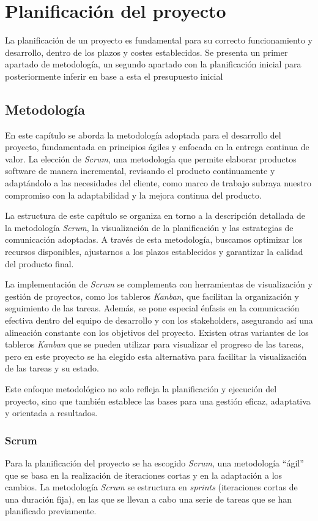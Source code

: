 \chapter{Planificación del proyecto}\label{chap:planif}
La planificación de un proyecto es fundamental para su correcto funcionamiento y desarrollo,
dentro de los plazos y costes establecidos. Se presenta un primer apartado de metodología, un
segundo apartado con la planificación inicial para posteriormente inferir en base a esta el
presupuesto inicial


\section{Metodología}\label{sec:metodología}
En este capítulo se aborda la metodología adoptada para el desarrollo del proyecto, fundamentada
en principios ágiles y enfocada en la entrega continua de valor. La elección de \textit{Scrum},
una metodología que permite elaborar productos software de manera incremental, revisando el
producto continuamente y adaptándolo a las necesidades del cliente, como marco de trabajo subraya
nuestro compromiso con la adaptabilidad y la mejora continua del producto.

La estructura de este capítulo se organiza en torno a la descripción detallada de la metodología
\textit{Scrum}, la visualización de la planificación y las estrategias de comunicación adoptadas.
A través de esta metodología, buscamos optimizar los recursos disponibles, ajustarnos a los plazos
establecidos y garantizar la calidad del producto final.

La implementación de \textit{Scrum} se complementa con herramientas de visualización y gestión de
proyectos, como los tableros \textit{Kanban}, que facilitan la organización y seguimiento de
las tareas. Además, se pone especial énfasis en la comunicación efectiva dentro del equipo de
desarrollo y con los stakeholders, asegurando así una alineación constante con los objetivos del
proyecto. Existen otras variantes de los tableros \textit{Kanban} que se pueden utilizar para
visualizar el progreso de las tareas, pero en este proyecto se ha elegido esta alternativa para
facilitar la visualización de las tareas y su estado.

Este enfoque metodológico no solo refleja la planificación y ejecución del proyecto, sino que
también establece las bases para una gestión eficaz, adaptativa y orientada a resultados.

\newpage{}
\subsection{Scrum}\label{subsec:scrum}
Para la planificación del proyecto se ha escogido \textit{Scrum}, una metodología ``ágil'' que se
basa en la realización de iteraciones cortas y en la adaptación a los cambios. La metodología
\textit{Scrum} se estructura en \textit{sprints} (iteraciones cortas de una duración fija),
en las que se llevan a cabo una serie de tareas que se han planificado previamente.

